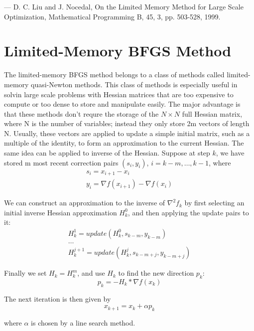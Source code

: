 ---
D. C. Liu and J. Nocedal, On the Limited Memory Method for Large Scale 
Optimization, Mathematical Programming B, 45, 3, pp. 503-528, 1999.

\section{Limited-Memory BFGS Method}

The limited-memory BFGS method belongs to a class of methods called 
limited-memory quasi-Newton methods. This class of methods is especially useful 
in solvin large scale problems with Hessian matrices that are too expensive to 
compute or too dense to store and manipulate easily. The major advantage is 
that these methods don't requre the storage of the \( N\times N \) full 
Hessian matrix, where N is the number of variables; instead they only store 
2m vectors of length N. Usually, these vectors are applied to update a simple 
initial matrix, such as a multiple of the identity, to form an approximation 
to the current Hessian. The same idea can be applied to inverse of the Hessian. 
Suppose at step \( k \), we have stored m most recent correction pairs 
\( (s_i,y_i) \), \( i = k-m, \ldots, k-1 \), where
\begin{gather}
    s_i = x_{i+1} - x_i \\
    y_i = \nabla f(x_{i+1}) - \nabla f(x_i)
\end{gather}

We can construct an approximation to the inverse of \( \nabla^2 f_k \) by first 
selecting an initial inverse Hessian approximation \( H_{k}^{0} \), and then 
applying the update pairs to it:
\begin{gather}
    H_{k}^{1} = update(H_{k}^{0}, s_{k-m}, y_{k-m}) \label{eq:3}\\
    \hdots \\
    H_{k}^{j+1} = update(H_{k}^{j}, s_{k-m+j}, y_{k-m+j})
\end{gather}

Finally we set \( H_k = H_{k}^{m} \), and use \( H_k \) to find the new 
direction \( p_k \):
\begin{equation}
    p_k = -H_{k}*\nabla f(x_k)
\end{equation}

The next iteration is then given by
\begin{equation}
    x_{k+1} = x_{k} + \alpha p_k
\end{equation}

where \( \alpha \) is chosen by a line search method.

